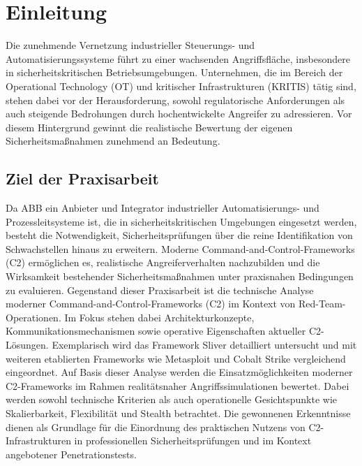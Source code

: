 \section{Einleitung}
Die zunehmende Vernetzung industrieller Steuerungs- und Automatisierungssysteme führt zu einer wachsenden Angriffsfläche, insbesondere in sicherheitskritischen Betriebsumgebungen. 
Unternehmen, die im Bereich der Operational Technology (OT) und kritischer Infrastrukturen (KRITIS) tätig sind, stehen dabei vor der Herausforderung, sowohl regulatorische Anforderungen als auch steigende Bedrohungen durch hochentwickelte Angreifer zu adressieren. 
Vor diesem Hintergrund gewinnt die realistische Bewertung der eigenen Sicherheitsmaßnahmen zunehmend an Bedeutung.
\subsection{Ziel der Praxisarbeit}
Da ABB ein Anbieter und Integrator industrieller Automatisierungs- und Prozessleitsysteme ist, die in sicherheitskritischen Umgebungen eingesetzt werden, besteht die Notwendigkeit, Sicherheitsprüfungen über die reine Identifikation von Schwachstellen hinaus zu erweitern.
Moderne Command-and-Control-Frameworks (C2) ermöglichen es, realistische Angreiferverhalten nachzubilden und die Wirksamkeit bestehender Sicherheitsmaßnahmen unter praxisnahen Bedingungen zu evaluieren.
\newline\newline
Gegenstand dieser Praxisarbeit ist die technische Analyse moderner Command-and-Control-Frameworks (C2) im Kontext von Red-Team-Operationen. 
Im Fokus stehen dabei Architekturkonzepte, Kommunikationsmechanismen sowie operative Eigenschaften aktueller C2-Lösungen. 
Exemplarisch wird das Framework Sliver detailliert untersucht und mit weiteren etablierten Frameworks wie Metasploit und Cobalt Strike vergleichend eingeordnet.
\newline\newline
Auf Basis dieser Analyse werden die Einsatzmöglichkeiten moderner C2-Frameworks im Rahmen realitätsnaher Angriffssimulationen bewertet. 
Dabei werden sowohl technische Kriterien als auch operationelle Gesichtspunkte wie Skalierbarkeit, Flexibilität und Stealth betrachtet. 
Die gewonnenen Erkenntnisse dienen als Grundlage für die Einordnung des praktischen Nutzens von C2-Infrastrukturen in professionellen Sicherheitsprüfungen und im Kontext angebotener Penetrationstests.
